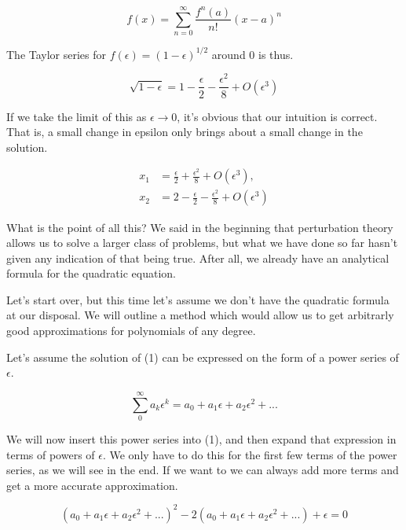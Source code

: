 \documentclass[12pt]{article}
\begin{document}
\begin{equation}
f(x) = \sum_{n=0}^{\infty} \frac{f^{n}(a)}{n!} (x-a)^n
\end{equation}

The Taylor series for $f(\epsilon) = (1 - \epsilon)^{1/2}$ around 0 is thus.

\begin{equation}
\sqrt{1 - \epsilon} = 1 - \frac{\epsilon}{2} - \frac{\epsilon^2}{8} + O(\epsilon^3)
\end{equation}

If we take the limit of this as $\epsilon \to 0$, it's obvious that our
intuition is correct. That is, a small change in epsilon only brings about a
small change in the solution.

\begin{align*}
x_1 &= \frac{\epsilon}{2} + \frac{\epsilon^2}{8} + O(\epsilon^3), \\
x_2 &= 2 - \frac{\epsilon}{2} - \frac{\epsilon^2}{8} + O(\epsilon^3)
\end{align*}

What is the point of all this? We said in the beginning that perturbation theory
allows us to solve a larger class of problems, but what we have done so far
hasn't given any indication of that being true. After all, we already have an
analytical formula for the quadratic equation.

Let's start over, but this time let's assume we don't have the quadratic formula
at our disposal. We will outline a method which would allow us to get arbitrarly
good approximations for polynomials of any degree.

Let's assume the solution of (1) can be expressed on the form of a power series
of $\epsilon$.

\begin{equation}
\sum_0^{\infty} a_k \epsilon^k = a_0 + a_1 \epsilon + a_2 \epsilon^2 + ...
\end{equation}

We will now insert this power series into (1), and then expand that expression
in terms of powers of $\epsilon$. We only have to do this for the first few
terms of the power series, as we will see in the end. If we want to we can
always add more terms and get a more accurate approximation.

\begin{equation}
(a_0 + a_1 \epsilon + a_2 \epsilon^2 + ...)^2 - 2(a_0 + a_1 \epsilon + a_2
\epsilon^2 + ...) + \epsilon = 0
\end{equation}
\end{document}
